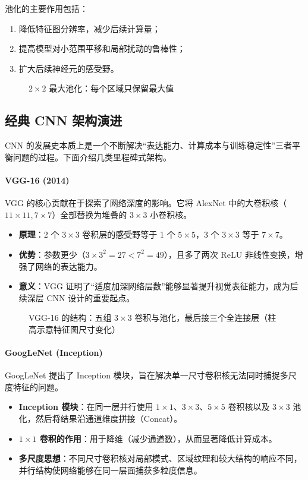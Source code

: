 池化的主要作用包括：
\begin{enumerate}
    \item 降低特征图分辨率，减少后续计算量；
    \item 提高模型对小范围平移和局部扰动的鲁棒性；
    \item 扩大后续神经元的感受野。
\end{enumerate}

\begin{figure}[H]
  \centering
  
  \caption{$2\times2$ 最大池化：每个区域只保留最大值}
  \label{fig:ch09_orig9}
\end{figure}

\subsection{经典 CNN 架构演进}

CNN 的发展史本质上是一个不断解决“表达能力、计算成本与训练稳定性”三者平衡问题的过程。下面介绍几类里程碑式架构。

\paragraph{VGG-16 (2014)}
VGG 的核心贡献在于探索了网络深度的影响。它将 AlexNet 中的大卷积核（$11\times11, 7\times7$）全部替换为堆叠的 $3\times3$ 小卷积核。
\begin{itemize}
    \item \textbf{原理}：2 个 $3\times3$ 卷积层的感受野等于 1 个 $5\times5$，3 个 $3\times3$ 等于 $7\times7$。
    \item \textbf{优势}：参数更少（$3 \times 3^2 = 27 < 7^2 = 49$），且多了两次 ReLU 非线性变换，增强了网络的表达能力。
    \item \textbf{意义}：VGG 证明了“适度加深网络层数”能够显著提升视觉表征能力，成为后续深层 CNN 设计的重要起点。
\end{itemize}

\begin{figure}[H]
  \centering
  \resizebox{0.9\textwidth}{!}{}
  \caption{VGG-16 的结构：五组 $3\times3$ 卷积与池化，最后接三个全连接层（柱高示意特征图尺寸变化）}
  \label{fig:ch09_orig10}
\end{figure}

\paragraph{GoogLeNet (Inception)}
GoogLeNet 提出了 Inception 模块，旨在解决单一尺寸卷积核无法同时捕捉多尺度特征的问题。
\begin{itemize}
    \item \textbf{Inception 模块}：在同一层并行使用 $1\times1$、$3\times3$、$5\times5$ 卷积核以及 $3\times3$ 池化，然后将结果沿通道维度拼接（Concat）。
    \item \textbf{$1\times1$ 卷积的作用}：用于降维（减少通道数），从而显著降低计算成本。
    \item \textbf{多尺度思想}：不同尺寸卷积核对局部模式、区域纹理和较大结构的响应不同，并行结构使网络能够在同一层面捕获多粒度信息。
\end{itemize}

